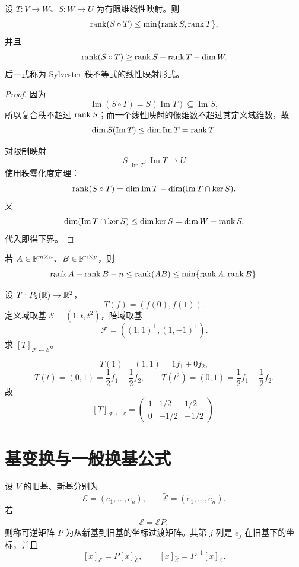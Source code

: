 \begin{theorem}[复合映射的秩不等式]
设 $T:V\to W$、$S:W\to U$ 为有限维线性映射。则
\[
\operatorname{rank}(S\circ T)\le\min\{\operatorname{rank} S,\operatorname{rank} T\},
\]
并且
\[
\operatorname{rank}(S\circ T)
\ge \operatorname{rank} S+\operatorname{rank} T-\dim W.
\]
后一式称为 Sylvester 秩不等式的线性映射形式。
\end{theorem}
\begin{proof}
因为
\[
\operatorname{Im}(S\circ T)=S(\operatorname{Im}T)
\subseteq\operatorname{Im}S,
\]
所以复合秩不超过 $\operatorname{rank} S$；而一个线性映射的像维数不超过其定义域维数，故
\[
\dim S(\operatorname{Im}T)\le\dim\operatorname{Im}T=\operatorname{rank} T.
\]

对限制映射
\[
S|_{\operatorname{Im}T}:\operatorname{Im}T\to U
\]
使用秩零化度定理：
\[
\operatorname{rank}(S\circ T)
=\dim\operatorname{Im}T
-\dim(\operatorname{Im}T\cap\ker S).
\]
又
\[
\dim(\operatorname{Im}T\cap\ker S)
\le\dim\ker S
=\dim W-\operatorname{rank} S.
\]
代入即得下界。
\end{proof}

\begin{corollary}
若 $A\in\mathbb{F}^{m\times n}$、$B\in\mathbb{F}^{n\times p}$，则
\[
\operatorname{rank} A+\operatorname{rank} B-n
\le\operatorname{rank}(AB)
\le\min\{\operatorname{rank} A,\operatorname{rank} B\}.
\]
\end{corollary}

\begin{example}[title={非标准基下求矩阵}]
设 $T:P_2(\mathbb{R})\to\mathbb{R}^2$，
\[
T(f)=(f(0),f(1)).
\]
定义域取基 $\mathcal E=(1,t,t^2)$，陪域取基
\[
\mathcal F=((1,1)^{\mathsf T},(1,-1)^{\mathsf T}).
\]
求 $[T]_{\mathcal F\leftarrow\mathcal E}$。
\begin{solution}
\[
T(1)=(1,1)=1f_1+0f_2,
\]
\[
T(t)=(0,1)=\frac12f_1-\frac12f_2,
\qquad
T(t^2)=(0,1)=\frac12f_1-\frac12f_2.
\]
故
\[
[T]_{\mathcal F\leftarrow\mathcal E}
=\begin{pmatrix}
1&1/2&1/2\\
0&-1/2&-1/2
\end{pmatrix}.
\]
\end{solution}
\end{example}

\section{基变换与一般换基公式}

\begin{definition}[过渡矩阵]
设 $V$ 的旧基、新基分别为
\[
\mathcal E=(e_1,\ldots,e_n),\qquad
\widetilde{\mathcal E}=(\widetilde e_1,\ldots,\widetilde e_n).
\]
若
\[
\widetilde{\mathcal E}=\mathcal E P,
\]
则称可逆矩阵 $P$ 为从新基到旧基的坐标过渡矩阵。其第 $j$ 列是 $\widetilde e_j$ 在旧基下的坐标，并且
\[
[x]_{\mathcal E}=P[x]_{\widetilde{\mathcal E}},
\qquad
[x]_{\widetilde{\mathcal E}}=P^{-1}[x]_{\mathcal E}.
\]
\end{definition}


